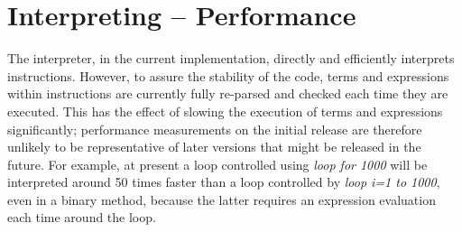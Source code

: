 \section{Interpreting -- Performance}
The interpreter, in the current implementation, directly and efficiently interprets \nr{}
instructions.  However, to assure the stability of the code, terms and
expressions within instructions are currently fully re-parsed and
checked each time they are executed.  This has the effect of slowing the
execution of terms and expressions significantly; performance
measurements on the initial release are therefore unlikely to be
representative of later versions that might be released in the future.
\newline
For example, at present a loop controlled using \emph{loop for
1000} will be interpreted around 50 times faster than a loop
controlled by \emph{loop i=1 to 1000}, even in a binary method,
because the latter requires an expression evaluation each time around
the loop.


